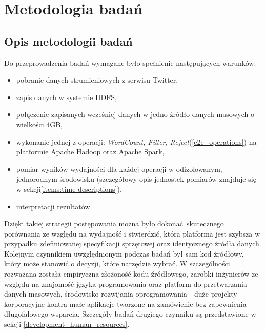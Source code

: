 \chapter{Metodologia badań} \label{chap.technology-stack}
\section{Opis metodologii badań}
Do przeprowadzenia badań wymagane było spełnienie następujących warunków:
\begin{itemize}
	\item pobranie danych strumieniowych z serwisu Twitter,
	\item zapis danych w systemie HDFS,
	\item połączenie zapisanych wcześniej danych w jedno źródło danych masowych o wielkości 4GB,
	\item wykonanie jednej z operacji: \textit{WordCount, Filter, Reject}(\ref{e2e_operations}) na platformie Apache Hadoop oraz Apache Spark,
	\item pomiar wyników wydajności dla każdej operacji w odizolowanym, jednorodnym środowisku (szczegółowy opis jednostek pomiarów znajduje się w sekcji\ref{items:time-descriptions}),
	\item interpretacji rezultatów.
\end{itemize}
Dzięki takiej strategii postępowania można było dokonać skutecznego porównania ze względu na wydajność i stwierdzić, która platforma jest szybsza w przypadku zdefiniowanej specyfikacji sprzętowej oraz identycznego źródła danych. Kolejnym czynnikiem uwzględnionym podczas badań był sam kod źródłowy, który może stanowić o decyzji, które narzędzie wybrać. W szczególności rozważana została empiryczna złożoność kodu źródłowego, zarobki inżynierów ze względu na znajomość języka programowania oraz platform do przetwarzania danych masowych, środowisko rozwijania oprogramowania - duże projekty korporacyjne kontra małe aplikacje tworzone na zamówienie bez zapewnienia długofalowego wsparcia. Szczegóły badań drugiego czynniku są przedstawione w sekcji \ref{development_human_resources}.  
